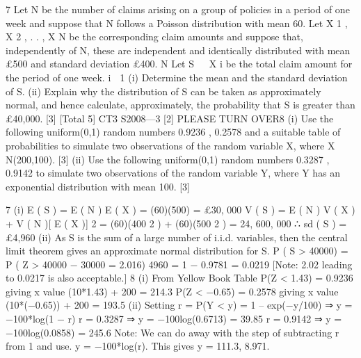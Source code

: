 7
Let N be the number of claims arising on a group of policies in a period of one week
and suppose that N follows a Poisson distribution with mean 60.
Let X 1 , X 2 , . . , X N be the corresponding claim amounts and suppose that,
independently of N, these are independent and identically distributed with mean £500
and standard deviation £400.
N
Let S   X i be the total claim amount for the period of one week.
i  1
(i) Determine the mean and the standard deviation of S.
(ii) Explain why the distribution of S can be taken as approximately normal, and
hence calculate, approximately, the probability that S is greater than £40,000.
[3]
[Total 5]
CT3 S2008—3
[2]
PLEASE TURN OVER8
(i)
Use the following uniform(0,1) random numbers
0.9236 , 0.2578
and a suitable table of probabilities to simulate two observations of the random
variable X, where X ~ N(200,100).
[3]
(ii)
Use the following uniform(0,1) random numbers
0.3287 , 0.9142
to simulate two observations of the random variable Y, where Y has an
exponential distribution with mean 100.
[3]


7
(i)
E ( S ) = E ( N ) E ( X ) = (60)(500) = £30, 000
V ( S ) = E ( N ) V ( X ) + V ( N )[ E ( X )] 2
= (60)(400 2 ) + (60)(500 2 ) = 24, 600, 000 ∴ sd ( S ) = £4,960
(ii)
As S is the sum of a large number of i.i.d. variables, then the central limit
theorem gives an approximate normal distribution for S.
P ( S > 40000) = P ( Z >
40000 − 30000
= 2.016)
4960
= 1 − 0.9781 = 0.0219
[Note: 2.02 leading to 0.0217 is also acceptable.]
8
(i)
From Yellow Book Table
P(Z < 1.43) = 0.9236 giving x value (10*1.43) + 200 = 214.3
P(Z < −0.65) = 0.2578 giving x value (10*(−0.65)) + 200 = 193.5
(ii)
Setting r = P(Y < y) = 1 – exp(−y/100) ⇒ y = −100*log(1 − r)
r = 0.3287 ⇒ y = −100log(0.6713) = 39.85
r = 0.9142 ⇒ y = −100log(0.0858) = 245.6
Note: We can do away with the step of subtracting r from 1 and use.
y = −100*log(r). This gives y = 111.3, 8.971.
